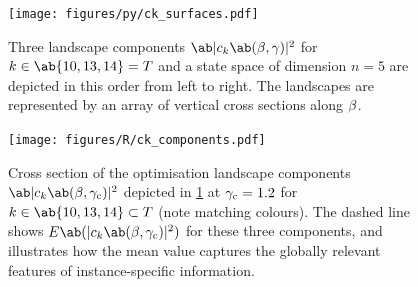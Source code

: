 \begin{figure}[htbp]
    \texttt{[image: figures/py/ck\_surfaces.pdf]}
    \caption{Three landscape components $\ab|c_k\ab(\mangle,\pangle)|^2$ for $k \in \ab\{10, 13, 14\} = T$ and a state space of dimension $n = 5$ are depicted in this order from left to right. The landscapes are represented by an array of vertical cross sections along $\beta$.}
    \label{fig:3d_overview}
\end{figure}
%
\begin{figure}[htbp]
    \texttt{[image: figures/R/ck\_components.pdf]}
    \caption{Cross section of the optimisation landscape components $\ab|c_k\ab(\mangle,\pangle_{\text{c}})|^2$  depicted in \cref{fig:3d_overview}
    at \(\gamma_{\text{c}}=1.2\) for $k \in \ab\{10, 13, 14\} \subset T$ (note matching colours). The dashed line shows \(E\ab(|c_k\ab(\mangle,\pangle_{\text{c}})|^2)\) for these three components, and illustrates how the mean value captures the globally relevant features of instance-specific information.}
    \label{fig:c_k_components}
\end{figure}


